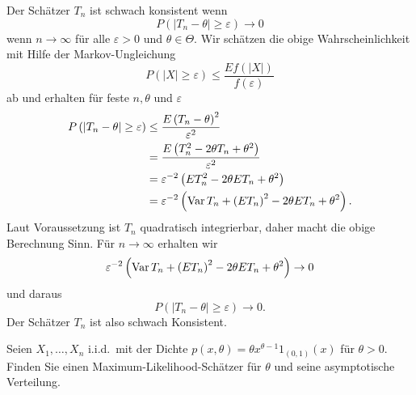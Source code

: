 \solution Der Schätzer $T_n$ ist schwach konsistent wenn
\begin{equation*}
    P\left( |T_n -\theta|\geq \varepsilon \right) \to 0
\end{equation*}
wenn $n\to\infty$ für alle $\varepsilon>0$ und $\theta\in\Theta$. Wir schätzen die obige
Wahrscheinlichkeit mit Hilfe der Markov-Ungleichung
\begin{equation*}
    P\left( |X|\geq \varepsilon \right) \leq \frac{E f(|X|)}{f(\varepsilon)}
\end{equation*}
ab und erhalten für feste $n,\theta$ und $\varepsilon$
\begin{align*}
    P\left( |T_n -\theta|\geq \varepsilon \right) &\leq \frac{E \left( T_n -\theta \right)^2}{\varepsilon^2} \\
    &= \frac{E \left( T_n^2 -2\theta T_n + \theta^2 \right) }{\varepsilon^2} \\
    &= \varepsilon^{-2}\left( E T_n^2 - 2\theta E T_n + \theta^2 \right) \\
    &= \varepsilon^{-2}\left( \operatorname{Var} T_n + \left( E T_n \right)^2 - 2\theta E T_n + \theta^2 \right).
\end{align*}
Laut Voraussetzung ist $T_n$ quadratisch integrierbar, daher macht die obige Berechnung Sinn.
Für $n\to\infty$ erhalten wir
\begin{equation*}
    \varepsilon^{-2}\left( \operatorname{Var} T_n + \left( E T_n \right)^2 - 2\theta E T_n + \theta^2 \right) \to 0
\end{equation*}
und daraus
\begin{equation*}
    P\left( |T_n -\theta|\geq \varepsilon \right) \to 0.
\end{equation*}
Der Schätzer $T_n$ ist also schwach Konsistent.







   Seien $X_1,\ldots,X_n$ i.i.d.\ mit 
der Dichte $p(x,\theta)= \theta x^{\theta-1}1_{(0,1)}(x)$ für $\theta>0$. Finden Sie 
einen Maximum-Likelihood-Schätzer für $\theta$ und seine asymptotische Verteilung.


